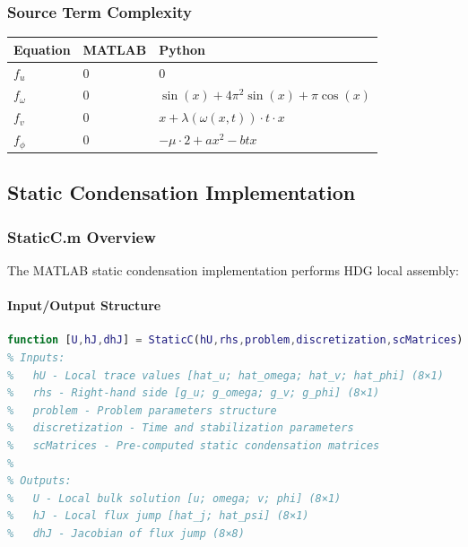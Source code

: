 \subsubsection{Source Term Complexity}

\begin{longtable}{|p{2cm}|p{5.5cm}|p{5.5cm}|}
\hline
\textbf{Equation} & \textbf{MATLAB} & \textbf{Python} \\
\hline
\endhead

$f_u$ & $0$ & $0$ \\
\hline

$f_\omega$ & $0$ & $\sin(x) + 4\pi^2\sin(x) + \pi\cos(x)$ \\
\hline

$f_v$ & $0$ & $x + \lambda(\omega(x,t)) \cdot t \cdot x$ \\
\hline

$f_\phi$ & $0$ & $-\mu \cdot 2 + a x^2 - b t x$ \\
\hline

\end{longtable}

\subsection{Static Condensation Implementation}
\label{subsec:static_condensation_implementation}

\subsubsection{StaticC.m Overview}

The MATLAB static condensation implementation performs HDG local assembly:

\paragraph{Input/Output Structure}
\begin{lstlisting}[language=Matlab, caption=StaticC.m Interface]
function [U,hJ,dhJ] = StaticC(hU,rhs,problem,discretization,scMatrices)
% Inputs:
%   hU - Local trace values [hat_u; hat_omega; hat_v; hat_phi] (8×1)
%   rhs - Right-hand side [g_u; g_omega; g_v; g_phi] (8×1)
%   problem - Problem parameters structure
%   discretization - Time and stabilization parameters
%   scMatrices - Pre-computed static condensation matrices
%
% Outputs:
%   U - Local bulk solution [u; omega; v; phi] (8×1)
%   hJ - Local flux jump [hat_j; hat_psi] (8×1)
%   dhJ - Jacobian of flux jump (8×8)
\end{lstlisting}


